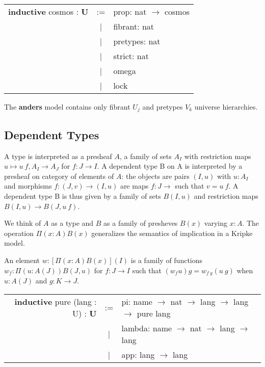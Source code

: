 \documentclass[a4paper,UKenglish,cleveref, autoref, thm-restate]{lipics-v2021}
\newcommand{\tabstyle}[0]{\scriptsize\ttfamily\fontseries{l}\selectfont}
\begin{document}
\begin{table}[ht]
\tabstyle
\begin{tabular}{rcl}
  \textbf{inductive} cosmos : \textbf{U}& := & prop: nat $\rightarrow$ cosmos \\
   &|& fibrant: nat \\
   &|& pretypes: nat \\
   &|& strict: nat \\
   &|& omega \\
   &|& lock \\
\end{tabular}
\end{table}

The \textbf{anders} model contains only fibrant $U_j$ and pretypes $V_k$ universe hierarchies.

\newpage

\subsection{Dependent Types}

\begin{definition}[Type]
A type is interpreted as a presheaf $A$, a family of sets $A_I$ with restriction maps
$u \mapsto u\ f, A_I \rightarrow A_J$ for $f: J\rightarrow I$. A dependent type
B on A is interpreted by a presheaf on category of elements of $A$: the objects
are pairs $(I,u)$ with $u : A_I$ and morphisms $f: (J,v) \rightarrow (I,u)$ are
maps $f : J \rightarrow$ such that $v = u\ f$. A dependent type B is thus given
by a family of sets $B(I,u)$ and restriction maps $B(I,u) \rightarrow B(J,u\ f)$.
\end{definition}


We think of $A$ as a type and $B$ as a family of presheves $B(x)$ varying $x:A$.
The operation $\Pi(x:A)B(x)$ generalizes the semantics of
implication in a Kripke model.

\begin{definition}[Pi]
An element $w:[\Pi(x:A)B(x)](I)$ is a family of functions $w_f : \Pi(u:A(J))B(J,u)$
for $f : J \rightarrow I$ such that $(w_f u)g=w_{f\ g}(u\ g)$ when $u:A(J)$ and $g:K\rightarrow J$.
\end{definition}
\begin{table}[ht]
\tabstyle
\begin{tabular}{rcl}
  \textbf{inductive} pure (lang : U) : \textbf{U}& := & pi: name $\rightarrow$ nat $\rightarrow$ lang $\rightarrow$ lang $\rightarrow$ pure lang \\
  &|& lambda: name $\rightarrow$ nat $\rightarrow$ lang $\rightarrow$ lang \\
  &|& app: lang $\rightarrow$ lang \\
\end{tabular}
\end{table}
\end{document}
